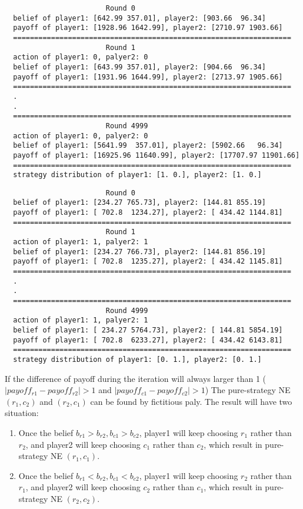 \documentclass[a4paper, oneside, final, 12pt]{scrartcl} %
\begin{document}
\begin{lstlisting}
                        Round 0
  belief of player1: [642.99 357.01], player2: [903.66  96.34]
  payoff of player1: [1928.96 1642.99], player2: [2710.97 1903.66]
  ==================================================================
                        Round 1
  action of player1: 0, palyer2: 0
  belief of player1: [643.99 357.01], player2: [904.66  96.34]
  payoff of player1: [1931.96 1644.99], player2: [2713.97 1905.66]
  ==================================================================
  .
  .
  ==================================================================
                        Round 4999
  action of player1: 0, palyer2: 0
  belief of player1: [5641.99  357.01], player2: [5902.66   96.34]
  payoff of player1: [16925.96 11640.99], player2: [17707.97 11901.66]
  ==================================================================
  strategy distribution of player1: [1. 0.], player2: [1. 0.]
\end{lstlisting}

\begin{lstlisting}
                        Round 0
  belief of player1: [234.27 765.73], player2: [144.81 855.19]
  payoff of player1: [ 702.8  1234.27], player2: [ 434.42 1144.81]
  ==================================================================
                        Round 1
  action of player1: 1, palyer2: 1
  belief of player1: [234.27 766.73], player2: [144.81 856.19]
  payoff of player1: [ 702.8  1235.27], player2: [ 434.42 1145.81]
  ==================================================================
  .
  .
  ==================================================================
                        Round 4999
  action of player1: 1, palyer2: 1
  belief of player1: [ 234.27 5764.73], player2: [ 144.81 5854.19]
  payoff of player1: [ 702.8  6233.27], player2: [ 434.42 6143.81]
  ==================================================================
  strategy distribution of player1: [0. 1.], player2: [0. 1.]
\end{lstlisting}

\newpage

\begingroup
\raggedright
If the difference of payoff during the iteration will always larger than 1
($|payoff_{r1} - payoff_{r2}| > 1$ and $|payoff_{c1} - payoff_{c2}| > 1$)
The pure-strategy NE $(r_1, c_2)$ and $(r_2, c_1)$ can be found by fictitious paly.
The result will have two situation:

\begin{enumerate}
  \item Once the belief $b_{r1} > b_{r2}, b_{c1} > b_{c2}$,
  player1 will keep choosing $r_1$ rather than $r_2$, 
  and player2 will keep choosing $c_1$ rather than $c_2$, 
  which result in pure-strategy NE $(r_1, c_1)$.
  \item Once the belief $b_{r1} < b_{r2}, b_{c1} < b_{c2}$,
  player1 will keep choosing $r_2$ rather than $r_1$, 
  and player2 will keep choosing $c_2$ rather than $c_1$, 
  which result in pure-strategy NE $(r_2, c_2)$.
\end{enumerate}
\endgroup
\end{document}
